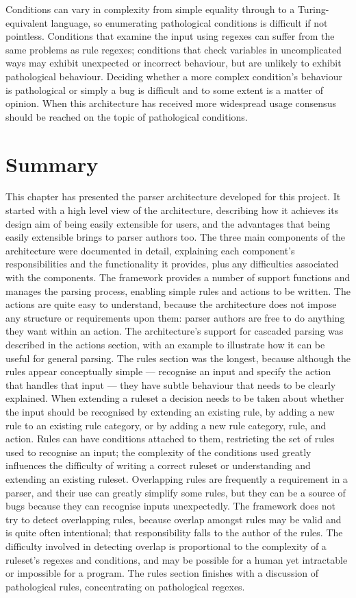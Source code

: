 Conditions can vary in complexity from simple equality through to a
Turing-equivalent language, so enumerating pathological conditions is
difficult if not pointless.  Conditions that examine the input using
regexes can suffer from the same problems as rule regexes; conditions that
check variables in uncomplicated ways may exhibit unexpected or incorrect
behaviour, but are unlikely to exhibit pathological behaviour.  Deciding
whether a more complex condition's behaviour is pathological or simply a
bug is difficult and to some extent is a matter of opinion.  When this
architecture has received more widespread usage consensus should be reached
on the topic of pathological conditions.

\section{Summary}

This chapter has presented the parser architecture developed for this
project.  It started with a high level view of the architecture, describing
how it achieves its design aim of being easily extensible for users, and
the advantages that being easily extensible brings to parser authors too.
The three main components of the architecture were documented in detail,
explaining each component's responsibilities and the functionality it
provides, plus any difficulties associated with the components.  The
framework provides a number of support functions and manages the parsing
process, enabling simple rules and actions to be written.  The actions are
quite easy to understand, because the architecture does not impose any
structure or requirements upon them: parser authors are free to do anything
they want within an action.  The architecture's support for cascaded
parsing was described in the actions section, with an example to illustrate
how it can be useful for general parsing.  The rules section was the
longest, because although the rules appear conceptually simple ---
recognise an input and specify the action that handles that input --- they
have subtle behaviour that needs to be clearly explained.  When extending a
ruleset a decision needs to be taken about whether the input should be
recognised by extending an existing rule, by adding a new rule to an
existing rule category, or by adding a new rule category, rule, and action.
Rules can have conditions attached to them, restricting the set of rules
used to recognise an input; the complexity of the conditions used greatly
influences the difficulty of writing a correct ruleset or understanding and
extending an existing ruleset.  Overlapping rules are frequently a
requirement in a parser, and their use can greatly simplify some rules, but
they can be a source of bugs because they can recognise inputs
unexpectedly.  The framework does not try to detect overlapping rules,
because overlap amongst rules may be valid and is quite often intentional;
that responsibility falls to the author of the rules.  The difficulty
involved in detecting overlap is proportional to the complexity of a
ruleset's regexes and conditions, and may be possible for a human yet
intractable or impossible for a program.  The rules section finishes with a
discussion of pathological rules, concentrating on pathological regexes.
